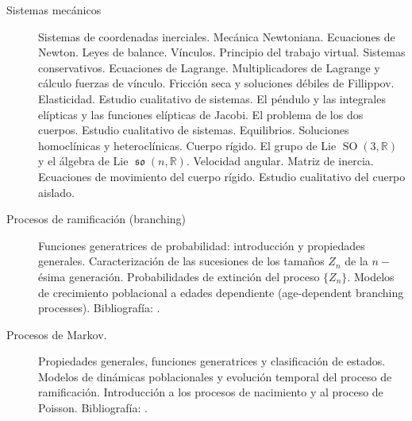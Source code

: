 \documentclass[a4paper,10pt,BCOR10mm,oneside,headsepline]{scrbook}
\DeclareMathOperator{\anti}{\mathfrak{so}}
\DeclareMathOperator{\SO}{SO}
\begin{document}
\begin{enumerate}
\begin{description}
\item[Sistemas mecánicos] Sistemas de coordenadas inerciales. Mecánica Newtoniana. Ecuaciones de Newton. Leyes de balance. Vínculos. Principio del trabajo virtual. Sistemas conservativos. Ecuaciones de Lagrange. Multiplicadores de Lagrange y cálculo fuerzas de vínculo. Fricción seca y soluciones débiles de Fillippov. Elasticidad. Estudio cualitativo de sistemas. El péndulo y las integrales elípticas y las funciones elípticas de Jacobi. El problema de los dos cuerpos. Estudio cualitativo  de sistemas. Equilibrios. Soluciones homoclínicas y heteroclínicas. Cuerpo rígido. El grupo de Lie  $\SO(3,\mathbb{R})$ y el álgebra de Lie $\anti(n,\mathbb{R})$. Velocidad angular. Matriz de inercia. Ecuaciones de movimiento del cuerpo rígido. Estudio cualitativo del cuerpo aislado. \cite{CliveDym710,lemos2007mecanica,DavidBetounes488,goldstein1987mecanica,arnold2007mathematical,arnold2013mathematical, NicolaBellomo725} 

\item[Procesos de ramificación (branching)] Funciones generatrices de probabilidad: introducción y propiedades generales. Caracterización de las sucesiones de los tamaños $Z_n$ de la $n-$ésima generación. Probabilidades de extinción   del proceso $\{Z_n \}$. Modelos de crecimiento poblacional a edades dependiente (age-dependent branching processes).    Bibliografía:  \cite{grimmet2004, SandipBanerjee729,durrett2010probability,LindaJ.S.Allen616}. 

\item[Procesos de Markov.] Propiedades generales, funciones generatrices y clasificación de estados. Modelos de dinámicas poblacionales y evolución temporal del proceso de ramificación. Introducción a los procesos de nacimiento y al proceso de Poisson.   Bibliografía:  \cite{grimmet2004, SandipBanerjee729,durrett2010probability,LindaJ.S.Allen616}.



\end{description}
\end{enumerate}
\end{document}
